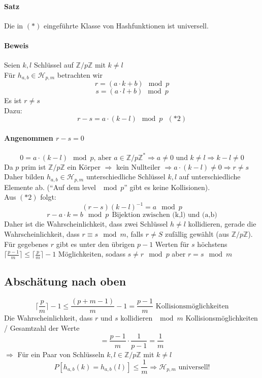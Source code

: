 \paragraph{Satz}
Die in $(*)$ eingeführte Klasse von Hashfunktionen ist universell.
\paragraph{Beweis}
Seien $k,l$ Schlüssel auf $\mathbb{Z}/p\mathbb{Z}$ mit $k\neq l$\\
Für $h_{a,b}\in \mathcal{H}_{p,m}$ betrachten wir
\[ r=(a\cdot k+b)\mod{p} \]
\[ s=(a\cdot l+b)\mod{p} \]
Es ist $r \neq s$\\
Dazu:
\[ r-s = a\cdot(k-l) \mod{p} ~~~(*2)\]
\paragraph{Angenommen $r-s=0$}
\[ 0=a\cdot(k-l)\mod{p}\text{, aber }a\in\mathbb{Z}/p\mathbb{Z}^* \Rightarrow a\neq 0\text{ und } k\neq l \Rightarrow k-l\neq 0 \]
Da $p$ prim ist $\mathbb{Z}/p\mathbb{Z}$ ein Körper $\Rightarrow$ kein Nullteiler $\Rightarrow a\cdot (k-l)\neq 0\Rightarrow r\neq s$\\
Daher bilden $h_{a,b}\in \mathcal{H}_{p,m}$ unterschiedliche Schlüssel $k,l$ auf unterschiedliche Elemente ab. ("`Auf dem level $\mod{p}$"' gibt es keine Kollisionen).\\
Aus $(*2)$ folgt:
\[ (r-s)(k-l)^{-1} = a\mod{p} \]
\[ r-a\cdot k = b\mod{p} ~~\text{Bijektion zwischen (k,l) und (a,b)}\]
Daher ist die Wahrscheinlichkeit, dass zwei Schlüssel $h\neq l$ kollidieren, gerade die Wahrscheinlichkeit, dass $r\equiv s \mod{m}$, falls $r\neq S$ zufällig gewählt (aus $\mathbb{Z}/p\mathbb{Z}$).\\
Für gegebenes $r$ gibt es unter den übrigen $p-1$ Werten für $s$ höchstens $\lceil \frac{p-1}{m} \rceil \leq \lceil \frac{p}{m} \rceil -1$ Möglichkeiten, sodass $s\neq r\mod{p}$ aber $r=s\mod{m}$
\subsection{Abschätung nach oben}
\[\lceil \frac{p}{m} \rceil -1  \leq \frac{(p+m-1)}{m}-1 = \frac{p-1}{m} \text{ Kollisionsmöglichkeiten} \]
Die Wahrscheinlichkeit, dass $r$ und $s$ kollidieren $\mod{m}$ Kollisionsmöglichkeiten / Gesamtzahl der Werte
\[ =\frac{p-1}{m}\cdot\frac{1}{p-1}=\frac{1}{m} \]
$\Rightarrow$ Für ein Paar von Schlüsseln $k,l\in \mathbb{Z}/p\mathbb{Z}$ mit $k\neq l$
\[ P[h_{a,b}(k)=h_{a,b}(l)] \leq \frac{1}{m} \Rightarrow \mathcal{H}_{p,m} \text{ universell!} \]
